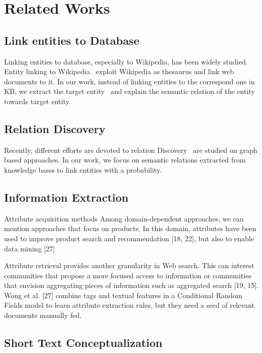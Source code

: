 \section{Related Works}




\subsection{Link entities to Database}

Linking entities to database, especially to Wikipedia, has been widely studied. Entity linking to Wikipedia~\cite{milne2008learning,mihalcea2007wikify,han2011collective} exploit Wikipedia as thesaurus and link web documents to it.
In our work, instead of linking entities to the correspond one in KB, we extract the target entity~\cite{dalvi2011automatic} and explain the semantic relation of the entity towards target entity.


\subsection{Relation Discovery}
Recently, different efforts are devoted to relation Discovery~\cite{fang2011rex,shahaf2010connecting,luo2007answering} are studied on graph based approaches.
In our work, we focus on semantic relations extracted from knowledge bases to link entities with a probability.
 

\subsection{Information Extraction}

Attribute acquisition methods 
Among domain-dependent approaches, we can mention approaches that focus on products. In this domain, attributes have been used to improve product search and recommendation [18, 22], but also to enable data mining [27]

Attribute retrieval provides another granularity in Web
search. This can interest communities that propose a more
focused access to information or communities that envision
aggregating pieces of information such as aggregated search
[19, 15].
Wong et al. [27]
combine tags and textual features in a Conditional Random
Fields model to learn attribute extraction rules, but they
need a seed of relevant documents manually fed.

\subsection{Short Text Conceptualization}